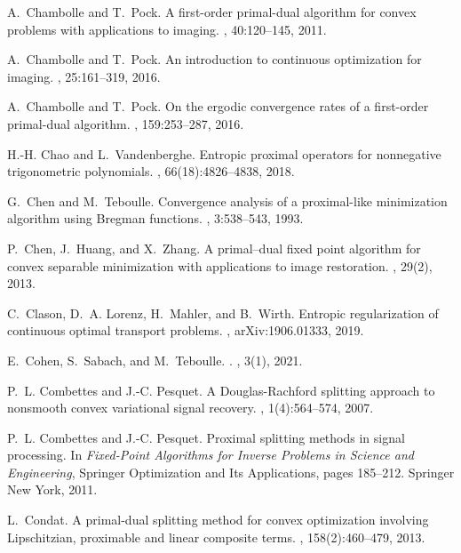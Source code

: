 \documentclass[letterpaper,11pt]{article}
\begin{document}
\begin{thebibliography}{10}
A.~Chambolle and T.~Pock.
\newblock A first-order primal-dual algorithm for convex problems with
  applications to imaging.
, 40:120--145, 2011.

A.~Chambolle and T.~Pock.
\newblock An introduction to continuous optimization for imaging.
, 25:161--319, 2016.

A.~Chambolle and T.~Pock.
\newblock On the ergodic convergence rates of a first-order primal-dual
  algorithm.
, 159:253--287, 2016.

H.-H. Chao and L.~Vandenberghe.
\newblock Entropic proximal operators for nonnegative trigonometric
  polynomials.
, 66(18):4826--4838,
  2018.

G.~Chen and M.~Teboulle.
\newblock Convergence analysis of a proximal-like minimization algorithm using
  {B}regman functions.
, 3:538--543, 1993.

P.~Chen, J.~Huang, and X.~Zhang.
\newblock A primal--dual fixed point algorithm for convex separable
  minimization with applications to image restoration.
, 29(2), 2013.

C.~Clason, D.~A. Lorenz, H.~Mahler, and B.~Wirth.
\newblock Entropic regularization of continuous optimal transport problems.
, arXiv:1906.01333, 2019.

E.~Cohen, S.~Sabach, and M.~Teboulle.
.
, 3(1), 2021.

P.~L. Combettes and J.-C. Pesquet.
\newblock A {D}ouglas-{R}achford splitting approach to nonsmooth convex
  variational signal recovery.
,
  1(4):564--574, 2007.

P.~L. Combettes and J.-C. Pesquet.
\newblock Proximal splitting methods in signal processing.
\newblock In {\em Fixed-Point Algorithms for Inverse Problems in Science and
  Engineering}, Springer Optimization and Its Applications, pages 185--212.
  Springer New York, 2011.

L.~Condat.
\newblock A primal-dual splitting method for convex optimization involving
  {L}ipschitzian, proximable and linear composite terms.
,
  158(2):460--479, 2013.


\end{thebibliography}
\end{document}
